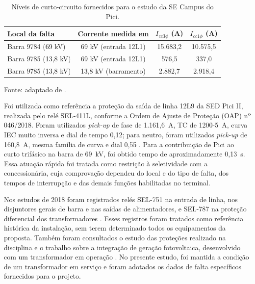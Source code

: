 \begin{table}[htbp]
    \centering
    \caption{Níveis de curto-circuito fornecidos para o estudo da SE Campus do Pici.}
    \label{tab:niveis_cc}
    \begin{tabular}{lccc}
        \hline
        \textbf{Local da falta} & \textbf{Corrente medida em} & \textbf{$I_{cc3\phi}$ (A)} & \textbf{$I_{cc1\phi}$ (A)} \\
        \hline
        Barra 9784 (69 kV)   & 69 kV (entrada 12L1)   & 15.683,2 & 10.575,5 \\
        Barra 9785 (13,8 kV) & 69 kV (entrada 12L1)   & 576,5    & 337,0    \\
        Barra 9785 (13,8 kV) & 13,8 kV (barramento)   & 2.882,7  & 2.918,4  \\
        \hline
    \end{tabular}
    \par\vspace{2pt}
    {\small Fonte: adaptado de \cite{sampaio2026roteiro}.}
\end{table}

Foi utilizada como referência a proteção da saída de linha 12L9 da SED Pici II, realizada pelo relé SEL-411L, conforme a Ordem de Ajuste de Proteção (OAP) nº 046/2018. Foram utilizados \textit{pick-up} de fase de 1.161,6~A, TC de 1200-5~A, curva IEC muito inversa e dial de tempo 0,12; para neutro, foram utilizados \textit{pick-up} de 160,8~A, mesma família de curva e dial 0,55 \cite{enel2018oap}. Para a contribuição de Pici ao curto trifásico na barra de 69~kV, foi obtido tempo de aproximadamente 0,13~s. Essa atuação rápida foi tratada como restrição à seletividade com a concessionária, cuja comprovação dependeu do local e do tipo de falta, dos tempos de interrupção e das demais funções habilitadas no terminal.

Nos estudos de 2018 foram registrados relés SEL-751 na entrada de linha, nos disjuntores gerais de barra e nas saídas de alimentadores, e SEL-787 na proteção diferencial dos transformadores \cite{ufc2018diagtempo}. Esses registros foram tratados como referência histórica da instalação, sem terem determinado todos os equipamentos da proposta. Também foram consultados o estudo das proteções realizado na disciplina \cite{andrade2016} e o trabalho sobre a integração de geração fotovoltaica, desenvolvido com um transformador em operação \cite{silveira2022}. No presente estudo, foi mantida a condição de um transformador em serviço e foram adotados os dados de falta específicos fornecidos para o projeto.

